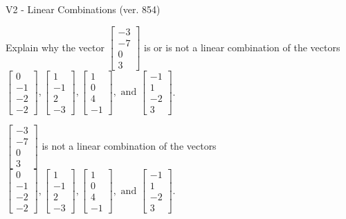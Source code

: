 \begin{exercise}
  \begin{exerciseTitle}V2 - Linear Combinations (ver. 854)\end{exerciseTitle}
  \begin{exerciseStatement}
    Explain why the vector \(\left[\begin{array}{c}
-3 \\
-7 \\
0 \\
3
\end{array}\right]\)  is or is not a linear 
	combination of the vectors \(\left[\begin{array}{c}
0 \\
-1 \\
-2 \\
-2
\end{array}\right] , \left[\begin{array}{c}
1 \\
-1 \\
2 \\
-3
\end{array}\right] , \left[\begin{array}{c}
1 \\
0 \\
4 \\
-1
\end{array}\right] , \text{ and } \left[\begin{array}{c}
-1 \\
1 \\
-2 \\
3
\end{array}\right]\).
	


  \end{exerciseStatement}
  \begin{exerciseAnswer}
   \(\left[\begin{array}{c}
-3 \\
-7 \\
0 \\
3
\end{array}\right]\) 
  	 is not  
	a linear combination of the vectors \(\left[\begin{array}{c}
0 \\
-1 \\
-2 \\
-2
\end{array}\right] , \left[\begin{array}{c}
1 \\
-1 \\
2 \\
-3
\end{array}\right] , \left[\begin{array}{c}
1 \\
0 \\
4 \\
-1
\end{array}\right] , \text{ and } \left[\begin{array}{c}
-1 \\
1 \\
-2 \\
3
\end{array}\right]\).


\end{exerciseAnswer}
\end{exercise}
